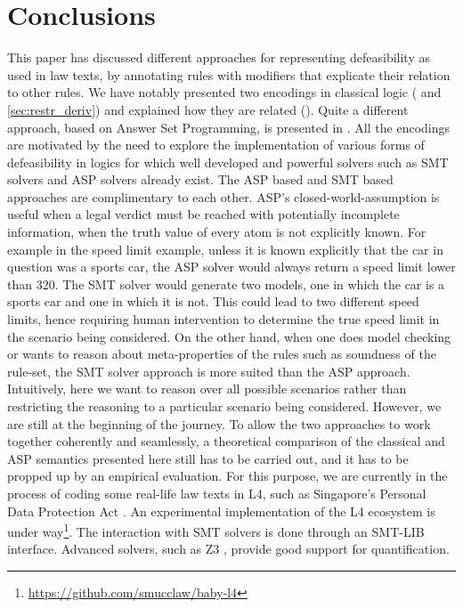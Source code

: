 \section{Conclusions}\label{sec:conclusions}

This paper has discussed different approaches for representing defeasibility
as used in law texts, by annotating rules with modifiers that explicate their
relation to other rules. We have notably presented two encodings in classical
logic ( and \ref{sec:restr_deriv}) and explained
how they are related (). Quite a different approach,
based on Answer Set Programming, is presented in
.  All the encodings are motivated by the need to explore the implementation of various forms of defeasibility in logics for which well developed and powerful solvers such as SMT solvers and ASP solvers already exist. The ASP based and SMT based approaches are complimentary to each other. ASP's closed-world-assumption is useful when a legal verdict must be reached with potentially incomplete information, when the truth value of every atom is not explicitly known. For example in the speed limit example, unless it is known explicitly that the car in question was a sports car, the ASP solver would always return a speed limit lower than $320$. The SMT solver would generate two models, one in which the car is a sports car and one in which it is not. This could lead to two different speed limits, hence requiring human intervention to determine the true speed limit in the scenario being considered. On the other hand, when one does model checking or wants to reason about meta-properties of the rules such as soundness of the rule-set, the SMT solver approach is more suited than the ASP approach. Intuitively, here we want to reason over all possible scenarios rather than restricting the reasoning to a particular scenario being considered. However, we are still at the beginning of the journey. To allow the two approaches to work together coherently and seamlessly, a theoretical comparison of the classical and ASP semantics presented here still has to be carried out, and it has to be propped up by an empirical evaluation. For this purpose, we are currently in the process of coding some real-life law texts in L4, such as Singapore's Personal Data Protection Act \citep{ppda}.
An experimental implementation of the L4 ecosystem is under way\footnote{\url{https://github.com/smucclaw/baby-l4}}. The interaction with SMT solvers is done through an SMT-LIB \citep{BarFT_SMTLIB} interface. Advanced solvers, such as Z3 \citep{demoura_bjorner_z3_2008}, provide good support for quantification. 


